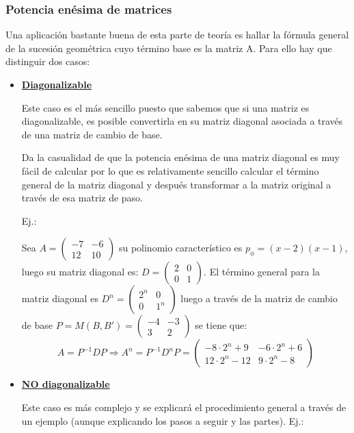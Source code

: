 \documentclass[10pt,a4paper,openright]{book}
\theoremstyle{break}
\begin{document}
\subsubsection{Potencia enésima de matrices}
Una aplicación bastante buena de esta parte de teoría es hallar la fórmula general de la sucesión geométrica cuyo término base es la matriz A. Para ello hay que distinguir dos casos:
\begin{itemize}
\item \underline{\textbf{Diagonalizable}}

Este caso es el más sencillo puesto que sabemos que si una matriz es diagonalizable, es posible convertirla en su matriz diagonal asociada a través de una matriz de cambio de base.

Da la casualidad de que la potencia enésima de una matriz diagonal es muy fácil de calcular por lo que es relativamente sencillo calcular el término general de la matriz diagonal y después transformar a la matriz original a través de esa matriz de paso.

Ej.:

Sea $A=\begin{pmatrix}-7&-6\\12&10\end{pmatrix}$ su polinomio característico es $p_\phi=(x-2)(x-1)$, luego su matriz diagonal es:
$D=\begin{pmatrix}2&0\\0&1\end{pmatrix}$. El término general para la matriz diagonal es $D^n=\begin{pmatrix}2^n&0\\0&1^n\end{pmatrix}$ luego a través de la matriz de cambio de base $P=M(B,B')=\begin{pmatrix}
-4&-3\\3&2\end{pmatrix}$ se tiene que:
$$A=P^{-1}DP\Rightarrow A^n=P^{-1}D^nP=\begin{pmatrix}
 -8\cdot 2^n+9&	-6\cdot 2^n+6\\
12\cdot 2^n-12&	 9\cdot 2^n-8
\end{pmatrix}
$$

\item \underline{\textbf{NO diagonalizable}}

Este caso es más complejo y se explicará el procedimiento general a través de un ejemplo (aunque explicando los pasos a seguir y las partes).
Ej.:
\end{itemize}
\end{document}
